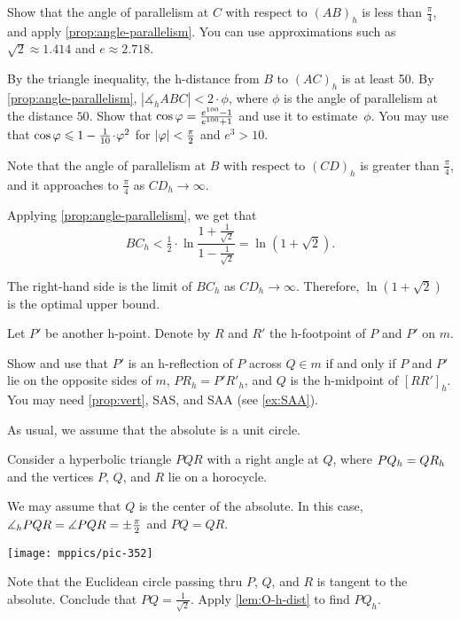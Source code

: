  Show that the angle of parallelism at $C$ with respect to $(AB)_h$ is less than $\tfrac\pi4$, and apply \ref{prop:angle-parallelism}.
You can use approximations such as $\sqrt2\approx 1.414$ and $e\approx2.718$.


By the triangle inequality, the h-distance from $B$ to $(AC)_h$ is at least 50.
By \ref{prop:angle-parallelism}, $|\measuredangle_h ABC|<2\cdot\phi$, where $\phi$ is the angle of parallelism at the distance $50$.
Show that $\cos\varphi=\tfrac{e^{100}-1}{e^{100}+1}$ and
use it to estimate~$\phi$.
You may use that $\cos\phi\z\le 1-\tfrac1{10}\cdot\phi^2$ for $|\varphi|<\tfrac\pi2$ and $e^3>10$.

Note that the angle of parallelism at $B$ with respect to $(CD)_h$ is greater than $\tfrac\pi4$,
and it approaches to $\tfrac\pi4$ as $CD_h\to\infty$.

Applying \ref{prop:angle-parallelism},
we get that
$$BC_h<\tfrac12\cdot\ln\frac{1+\frac1{\sqrt{2}}}{1-\frac1{\sqrt{2}}}=\ln\left(1+\sqrt{2}\right).$$

The right-hand side is the limit of $BC_h$ as $CD_h\to\infty$.
Therefore, $\ln\left(1+\sqrt{2}\right)$ is the optimal upper bound.


Let $P'$ be another h-point.
Denote by $R$ and $R'$ the h-footpoint of $P$ and $P'$ on $m$.

Show and use that $P'$ is an h-reflection of $P$ across $Q\in m$ if and only if $P$ and $P'$ lie on the opposite sides of $m$, 
$PR_h=P'R'_h$, and $Q$ is the h-midpoint of $[RR']_h$. 
You may need \ref{prop:vert}, SAS, and SAA (see \ref{ex:SAA}).

As usual, we assume that the absolute is a unit circle. 

Consider a hyperbolic triangle $PQR$
with a right angle at $Q$, where  $PQ_h=QR_h$
and the vertices $P$, $Q$, and $R$ 
lie on a horocycle.

We may assume that $Q$ is the center of the absolute.
In this case, $\measuredangle_hPQR=\measuredangle PQR=\pm\tfrac\pi2$ and $PQ=QR$.

\begin{Figure}
\vskip-0mm
\centering
\texttt{[image: mppics/pic-352]}
\end{Figure}

Note that the Euclidean circle passing thru $P$, $Q$, and $R$ is tangent to the absolute.
Conclude that $PQ=\tfrac1{\sqrt2}$. 
Apply \ref{lem:O-h-dist} to find $PQ_h$.


